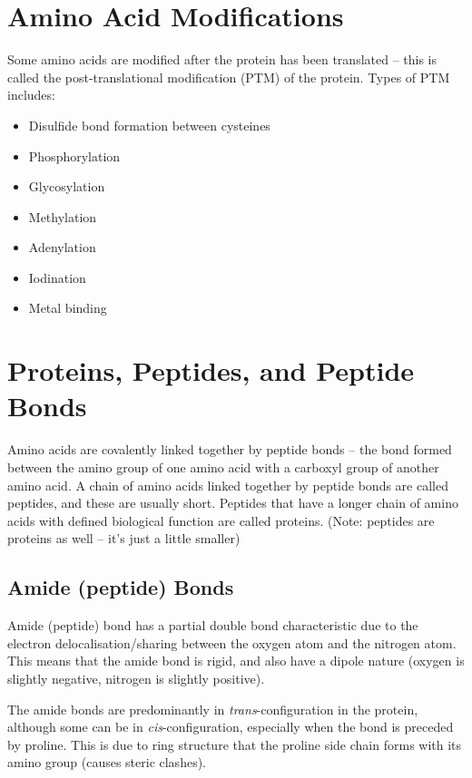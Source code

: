 
\section{Amino Acid Modifications}

Some amino acids are modified after the protein has been translated -- this is called the post-translational modification (PTM) of the protein.
Types of PTM includes:
\begin{itemize}
    \item Disulfide bond formation between cysteines
    \item Phosphorylation
    \item Glycosylation
    \item Methylation
    \item Adenylation
    \item Iodination
    \item Metal binding
\end{itemize}

\section{Proteins, Peptides, and Peptide Bonds}

Amino acids are covalently linked together by peptide bonds -- the bond formed between the amino group of one amino acid with a carboxyl group of another amino acid.
A chain of amino acids linked together by peptide bonds are called peptides, and these are usually short.
Peptides that have a longer chain of amino acids with defined biological function are called proteins.
(Note: peptides are proteins as well -- it's just a little smaller)

\subsection{Amide (peptide) Bonds}

Amide (peptide) bond has a partial double bond characteristic due to the electron delocalisation/sharing between the oxygen atom and the nitrogen atom.
This means that the amide bond is rigid, and also have a dipole nature (oxygen is slightly negative, nitrogen is slightly positive).

The amide bonds are predominantly in \textit{trans}-configuration in the protein, although some can be in \textit{cis}-configuration, especially when the bond is preceded by proline.
This is due to ring structure that the proline side chain forms with its amino group (causes steric clashes).


